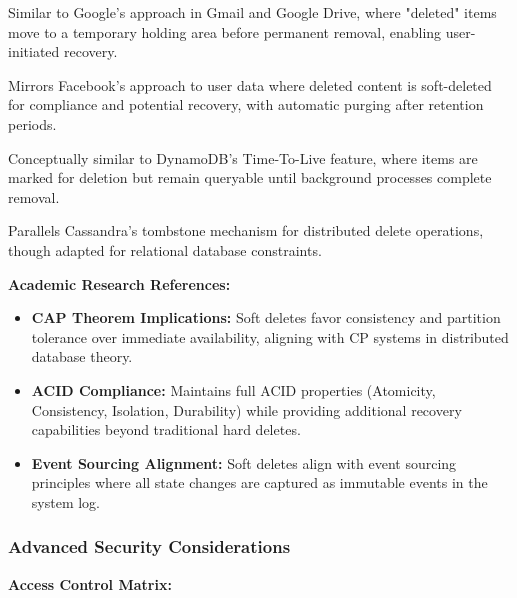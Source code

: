 \documentclass[12pt,a4paper]{article}
\begin{document}
\begin{description}[leftmargin=2em, itemsep=8pt, style=nextline]
    \item[\textbf{Google's Deletion Model:}] Similar to Google's approach in Gmail and Google Drive, where "deleted" items move to a temporary holding area before permanent removal, enabling user-initiated recovery.
    
    \item[\textbf{Facebook's Archive Strategy:}] Mirrors Facebook's approach to user data where deleted content is soft-deleted for compliance and potential recovery, with automatic purging after retention periods.
    
    \item[\textbf{Amazon's DynamoDB TTL:}] Conceptually similar to DynamoDB's Time-To-Live feature, where items are marked for deletion but remain queryable until background processes complete removal.
    
    \item[\textbf{Netflix's Cassandra Tombstones:}] Parallels Cassandra's tombstone mechanism for distributed delete operations, though adapted for relational database constraints.
\end{description}

\vspace{0.5em}

\textbf{Academic Research References:}

\begin{itemize}[leftmargin=2em, itemsep=6pt]
    \item \textbf{CAP Theorem Implications:} Soft deletes favor consistency and partition tolerance over immediate availability, aligning with CP systems in distributed database theory.
    \item \textbf{ACID Compliance:} Maintains full ACID properties (Atomicity, Consistency, Isolation, Durability) while providing additional recovery capabilities beyond traditional hard deletes.
    \item \textbf{Event Sourcing Alignment:} Soft deletes align with event sourcing principles where all state changes are captured as immutable events in the system log.
\end{itemize}

\subsubsection{Advanced Security Considerations}

\textbf{Access Control Matrix:}
\end{document}
